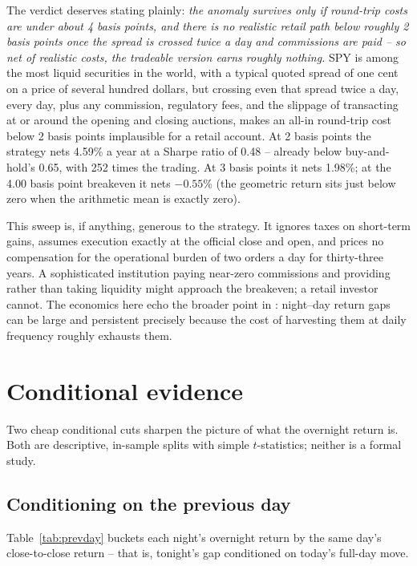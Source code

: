 \documentclass[11pt]{article}
\begin{document}
The verdict deserves stating plainly: \emph{the anomaly survives only if round-trip costs are under about 4 basis points, and there is no realistic retail path below roughly 2 basis points once the spread is crossed twice a day and commissions are paid -- so net of realistic costs, the tradeable version earns roughly nothing.} SPY is among the most liquid securities in the world, with a typical quoted spread of one cent on a price of several hundred dollars, but crossing even that spread twice a day, every day, plus any commission, regulatory fees, and the slippage of transacting at or around the opening and closing auctions, makes an all-in round-trip cost below 2 basis points implausible for a retail account. At 2 basis points the strategy nets 4.59\% a year at a Sharpe ratio of 0.48 -- already below buy-and-hold's 0.65, with 252 times the trading. At 3 basis points it nets 1.98\%; at the 4.00 basis point breakeven it nets $-0.55$\% (the geometric return sits just below zero when the arithmetic mean is exactly zero).

This sweep is, if anything, generous to the strategy. It ignores taxes on short-term gains, assumes execution exactly at the official close and open, and prices no compensation for the operational burden of two orders a day for thirty-three years. A sophisticated institution paying near-zero commissions and providing rather than taking liquidity might approach the breakeven; a retail investor cannot. The economics here echo the broader point in \citet{lou2019}: night--day return gaps can be large and persistent precisely because the cost of harvesting them at daily frequency roughly exhausts them.

\section{Conditional evidence}
\label{sec:conditional}

Two cheap conditional cuts sharpen the picture of what the overnight return is. Both are descriptive, in-sample splits with simple $t$-statistics; neither is a formal study.

\subsection{Conditioning on the previous day}

Table~\ref{tab:prevday} buckets each night's overnight return by the same day's close-to-close return -- that is, tonight's gap conditioned on today's full-day move.
\end{document}
